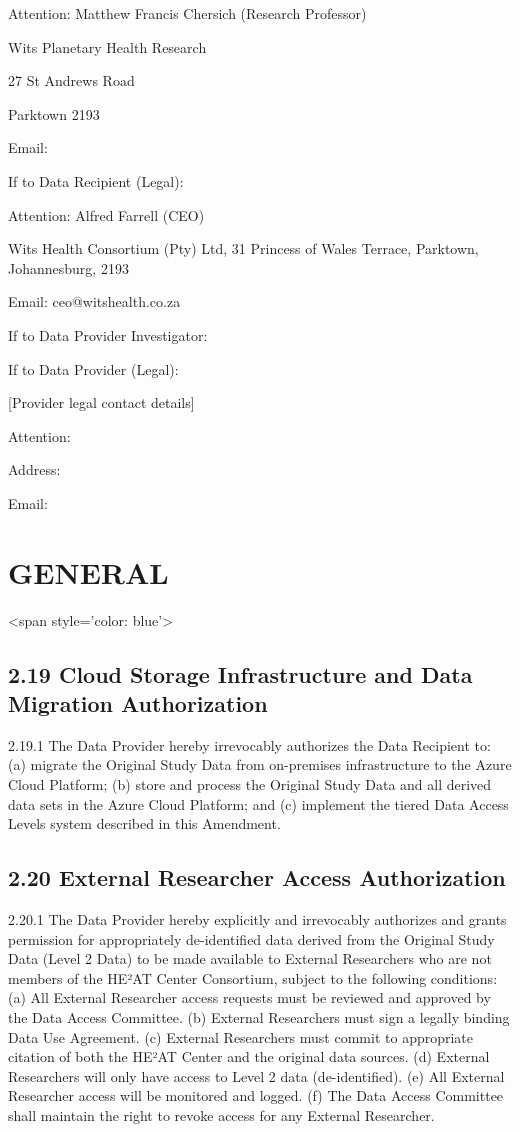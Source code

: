 \documentclass[12pt,letterpaper]{article}
\begin{document}
Attention: Matthew Francis Chersich (Research Professor)

Wits Planetary Health Research

27 St Andrews Road

Parktown 2193

Email:

If to Data Recipient (Legal):

Attention: Alfred Farrell (CEO)

Wits Health Consortium (Pty) Ltd, 31 Princess of Wales Terrace, Parktown, Johannesburg, 2193

Email: ceo@witshealth.co.za

If to Data Provider Investigator:

If to Data Provider (Legal):

[Provider legal contact details]

Attention:

Address:

Email:

\section*{GENERAL}

<span style='color: blue'>

\subsection*{2.19 Cloud Storage Infrastructure and Data Migration Authorization}

2.19.1 The Data Provider hereby irrevocably authorizes the Data Recipient to: (a) migrate the Original Study Data from on-premises infrastructure to the Azure Cloud Platform; (b) store and process the Original Study Data and all derived data sets in the Azure Cloud Platform; and (c) implement the tiered Data Access Levels system described in this Amendment.

\subsection*{2.20 External Researcher Access Authorization}

2.20.1 The Data Provider hereby explicitly and irrevocably authorizes and grants permission for appropriately de-identified data derived from the Original Study Data (Level 2 Data) to be made available to External Researchers who are not members of the HE²AT Center Consortium, subject to the following conditions: (a) All External Researcher access requests must be reviewed and approved by the Data Access Committee. (b) External Researchers must sign a legally binding Data Use Agreement. (c) External Researchers must commit to appropriate citation of both the HE²AT Center and the original data sources. (d) External Researchers will only have access to Level 2 data (de-identified). (e) All External Researcher access will be monitored and logged. (f) The Data Access Committee shall maintain the right to revoke access for any External Researcher.
\end{document}
